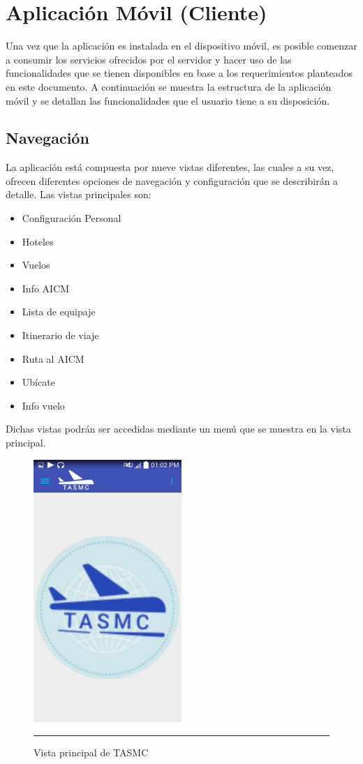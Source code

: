\section{Aplicación Móvil (Cliente)}

Una vez que la aplicación es instalada en el dispositivo móvil, es posible comenzar a consumir los servicios ofrecidos por el servidor y hacer uso de las funcionalidades que se tienen disponibles en base a los requerimientos planteados en este documento.
A continuación se muestra la estructura de la aplicación móvil y se detallan las funcionalidades que el usuario tiene a su disposición.

\subsection{Navegación}
La aplicación está compuesta por nueve vistas diferentes, las cuales a su vez, ofrecen diferentes opciones de navegación y configuración que se describirán a detalle. 
Las vistas principales son:
\begin{itemize}
    \item Configuración Personal
    \item Hoteles
    \item Vuelos
    \item Info AICM
    \item Lista de equipaje 
    \item Itinerario de viaje 
    \item Ruta al AICM
    \item Ubícate 
    \item Info vuelo  
    	\end{itemize}

Dichas vistas podrán ser accedidas mediante un menú que se muestra en la vista principal.
\begin{figure}[h]
	\centering
		\includegraphics[width=0.5\textwidth]{Figuras/main.png}
		\rule{30em}{0.5pt}
	\caption[Vista principal de TASMC]{Vista principal de TASMC}
	\label{fig:vistaprincipalTASMC}
\end{figure}

